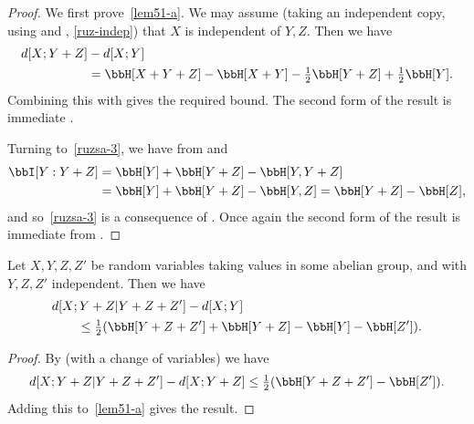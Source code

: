   \begin{proof}
    \leanok
  We first prove~\eqref{lem51-a}. We may assume (taking an independent copy, using  and , \ref{ruz-indep}) that $X$ is independent of $Y, Z$. Then we have
  \begin{align*}  d[X ;Y+ Z] & - d[X ;Y] \\ & = \bbH[X + Y + Z] - \bbH[X + Y] - \tfrac{1}{2}\bbH[Y + Z] + \tfrac{1}{2} \bbH[Y].\end{align*}
  Combining this with  gives the required bound. The second form of the result is immediate .

  Turning to~\eqref{ruzsa-3}, we have from  and 
  \begin{align*}  \bbI[Y : Y+ Z] & = \bbH[Y] + \bbH[Y + Z] - \bbH[Y, Y + Z] \\ & = \bbH[Y] + \bbH[Y + Z] - \bbH[Y, Z]  = \bbH[Y + Z] - \bbH[Z],\end{align*}
  and so~\eqref{ruzsa-3} is a consequence of . Once again the second form of the result is immediate from .
\end{proof}

\begin{lemma}\label{second-useful}
  \leanok
  Let $X, Y, Z, Z'$ be random variables taking values in some abelian group, and with $Y, Z, Z'$ independent. Then we have
  \begin{align}\nonumber
  & d[X ;Y + Z | Y + Z + Z'] - d[X ;Y] \\ & \qquad \leq \tfrac{1}{2} ( \bbH[Y + Z + Z'] + \bbH[Y + Z] - \bbH[Y] - \bbH[Z']).\label{7111}
  \end{align}
  \end{lemma}

  \begin{proof}
    \leanok
  By  (with a change of variables) we have
  \[d[X ; Y + Z | Y + Z + Z'] - d[X ; Y + Z] \leq \tfrac{1}{2}( \bbH[Y + Z + Z'] - \bbH[Z']).\]
  Adding this to~\eqref{lem51-a} gives the result.
  \end{proof}
